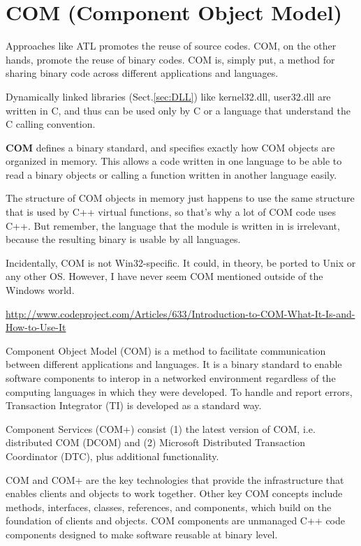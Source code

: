 \section{COM (Component Object Model)}
\label{sec:COM}

Approaches like ATL promotes the reuse of source codes.
COM, on the other hands, promote the reuse of binary codes.
COM is, simply put, a method for sharing binary code across different
applications and languages.

Dynamically linked libraries (Sect.\ref{sec:DLL}) like kernel32.dll, user32.dll
are written in C, and thus can be used only by C or a language that understand
the C calling convention.

{\bf COM } defines a binary standard, and specifies exactly how COM objects are
organized in memory. This allows a code written in one language to be able to
read a binary objects or calling a function written in another language easily.

The structure of COM objects in memory just happens to use the same structure
that is used by C++ virtual functions, so that's why a lot of COM code uses C++.
But remember, the language that the module is written in is irrelevant, because
the resulting binary is usable by all languages.


Incidentally, COM is not Win32-specific. It could, in theory, be ported to Unix
or any other OS. However, I have never seem COM mentioned outside of the Windows
world.

\url{http://www.codeproject.com/Articles/633/Introduction-to-COM-What-It-Is-and-How-to-Use-It}


Component Object Model (COM) is a method to facilitate communication between
different applications and languages. It is a binary standard to enable
software components to interop in a networked environment regardless of the
computing languages in which they were developed. To handle and report errors,
Transaction Integrator (TI) is developed as a standard way. 

Component Services (COM+) consist (1) the latest version of COM, i.e.
distributed COM (DCOM) and (2) Microsoft Distributed Transaction Coordinator
(DTC), plus additional functionality. 

COM and COM+ are the key technologies that provide the infrastructure that
enables clients and objects to work together. Other key COM concepts include
methods, interfaces, classes, references, and components, which build on the
foundation of clients and objects. COM components are unmanaged C++ code
components designed to make software reusable at binary level.

